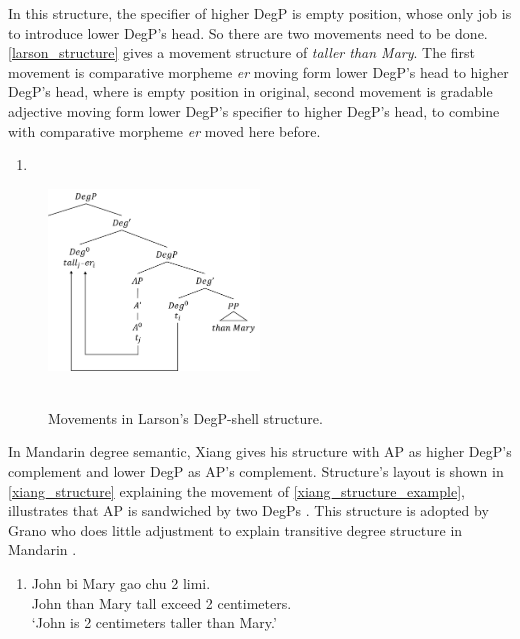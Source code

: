 \documentclass{ctexart}
\let \cite \parencite
\begin{document}
In this structure, the specifier of higher DegP is empty position, whose only job is to introduce lower DegP's head. So there are two movements need to be done. \ref{larson_structure} gives a movement structure of \textit{taller than Mary}. The first movement is comparative morpheme \textit{er} moving form lower DegP's head to higher DegP's head, where is empty position in original, second movement is gradable adjective moving form lower DegP's specifier to higher DegP's head, to combine with comparative morpheme \textit{er} moved here before.

\begin{enumerate}
    \item \label{larson_structure}
\end{enumerate}

\begin{figure}[H]
    \centering
    \includegraphics[width=0.5\textwidth]{pic/larson1.png}
    \begin{caption}
        \\ \vspace{-1.1ex}
        Movements in Larson's DegP-shell structure.
    \end{caption}
\end{figure}

In Mandarin degree semantic, Xiang gives his structure with AP as higher DegP's complement and lower DegP as AP's complement. Structure's layout is shown in \ref{xiang_structure} explaining the movement of \ref{xiang_structure_example}, illustrates that AP is sandwiched by two DegPs \cite{xiang2005}. This structure is adopted by Grano who does little adjustment to explain transitive degree structure in Mandarin \cite{grano2012}. 

\begin{enumerate}
    \item \label{xiang_structure_example}
    John bi Mary gao chu 2 limi.  \\
    John than Mary tall exceed 2 centimeters. \\
    `John is 2 centimeters taller than Mary.'
\end{enumerate}
\end{document}
